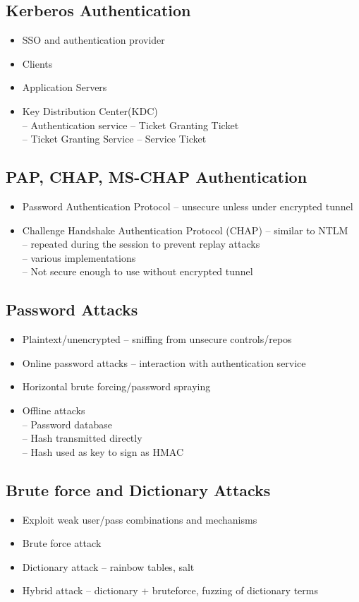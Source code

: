 	\subsection {Kerberos Authentication}
		\begin{itemize}
			\item SSO and authentication provider
			\item Clients
			\item Application Servers
			\item Key Distribution Center(KDC) \\
				-- Authentication service -- Ticket Granting Ticket \\
				-- Ticket Granting Service -- Service Ticket
		\end{itemize}
	\subsection {PAP, CHAP, MS-CHAP Authentication}
		\begin{itemize}
			\item Password Authentication Protocol -- unsecure unless under encrypted
				tunnel
			\item Challenge Handshake Authentication Protocol (CHAP) -- similar to NTLM \\
				-- repeated during the session to prevent replay attacks \\
				-- various implementations \\
				-- Not secure enough to use without encrypted tunnel
		\end{itemize}
	\subsection {Password Attacks}
		\begin{itemize}
			\item Plaintext/unencrypted -- sniffing from unsecure controls/repos
			\item Online password attacks -- interaction with authentication service
			\item Horizontal brute forcing/password spraying
			\item Offline attacks \\
				-- Password database \\
				-- Hash transmitted directly \\
				-- Hash used as key to sign as HMAC
		\end{itemize}
	\subsection {Brute force and Dictionary Attacks}
		\begin{itemize}
			\item Exploit weak user/pass combinations and mechanisms
			\item Brute force attack
			\item Dictionary attack -- rainbow tables, salt
			\item Hybrid attack -- dictionary + bruteforce, fuzzing of dictionary terms
		\end{itemize}

